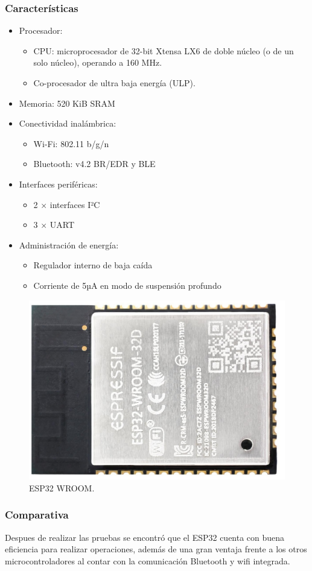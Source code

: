 \subsubsection{Características}
\begin{itemize}
    \item Procesador:
          \begin{itemize}
              \item CPU: microprocesador de 32-bit Xtensa LX6 de doble núcleo (o de un solo núcleo), operando a 160 MHz.
              \item Co-procesador de ultra baja energía (ULP).
          \end{itemize}
    \item Memoria: 520 KiB SRAM
    \item Conectividad inalámbrica:
          \begin{itemize}
              \item Wi-Fi: 802.11 b/g/n
              \item Bluetooth: v4.2 BR/EDR y BLE
          \end{itemize}
    \item Interfaces periféricas:
          \begin{itemize}
              \item 2 × interfaces I²C
              \item 3 × UART
          \end{itemize}
    \item Administración de energía:
          \begin{itemize}
              \item Regulador interno de baja caída
              \item Corriente de 5µA en modo de suspensión profundo
          \end{itemize}
\end{itemize}

\begin{figure}[htp!]
    \centering
    \includegraphics[width = 0.25 \textwidth]{ESP32-WROOM-32D_t.jpg}
    \caption{ESP32 WROOM.}
    \label{fig: esp32}
\end{figure}
\FloatBarrier

\subsubsection{Comparativa}
Despues de realizar las pruebas se encontró que el ESP32 cuenta con buena eficiencia para realizar operaciones, además de una gran ventaja frente a los otros microcontroladores al contar con la comunicación Bluetooth y wifi integrada.

